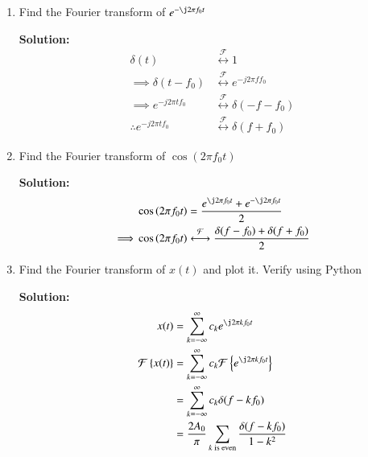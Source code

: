 \documentclass[journal,12pt,twocolumn]{IEEEtran}
\newcommand{\solution}{\noindent \textbf{Solution: }}
\providecommand{\brak}[1]{\ensuremath{\left(#1\right)}}
\providecommand{\cbrak}[1]{\ensuremath{\left\{#1\right\}}}
\providecommand{\der}[1]{\mathrm{d} #1}
\providecommand{\system}[1]{\overset{\mathcal{#1}}{ \longleftrightarrow}}
\numberwithin{equation}{section}
\numberwithin{figure}{section}
\renewcommand\thesection{\arabic{section}}
\begin{document}
\begin{enumerate}[label=\thesection.\arabic*,ref=\thesection.\theenumi]
	\solution 
	\begin{align}
		\delta(t)\system{F} &\int_{-\infty}^{\infty}\delta(t)e^{-j2\pi ft}\,\der{t} \\
		=& \left. e^{-j2\pi ft} \right|_{t=0} \\
		=& 1
	\end{align}
	
	\item Find the Fourier transform of $e^{-\j2\pi f_0 t}$
	
	\solution 
	\begin{align}
		\delta(t) &\system{F} 1 \\
		\implies \delta(t-f_0) &\system{F} e^{-j2\pi ff_0} \\
		\implies e^{-j2\pi tf_0} &\system{F} \delta(-f-f_0) \\
		\therefore e^{-j2\pi tf_0} &\system{F} \delta(f+f_0)
	\end{align}
	
	\item Find the Fourier transform of $\cos\brak{2\pi f_0 t}$
	
	\solution 
	\begin{align}
		&\cos\brak{2\pi f_0 t} = \frac{e^{\j2\pi f_0 t} + e^{-\j2\pi f_0 t}}{2} \\
		\implies &\cos\brak{2\pi f_0 t} \system{F} \frac{\delta(f-f_0) + \delta(f+f_0)}{2}
	\end{align}

	\item Find the Fourier transform of $x(t)$ and plot it. Verify using Python

	\solution 
	\begin{align}
		x(t) &= \sum_{k=-\infty}^\infty c_k e^{\j 2\pi kf_0t} \\
		\mathcal{F}\cbrak{x(t)} &= \sum_{k=-\infty}^\infty c_k \mathcal{F}\cbrak{e^{\j 2\pi kf_0t}} \\
		&= \sum_{k=-\infty}^\infty c_k \delta(f-kf_0) \\
		&= \frac{2A_0}{\pi} \sum_{k \text{ is even}} \frac{\delta(f-kf_0)}{1-k^2}
	\end{align}
	\end{enumerate}
	
\end{document}
